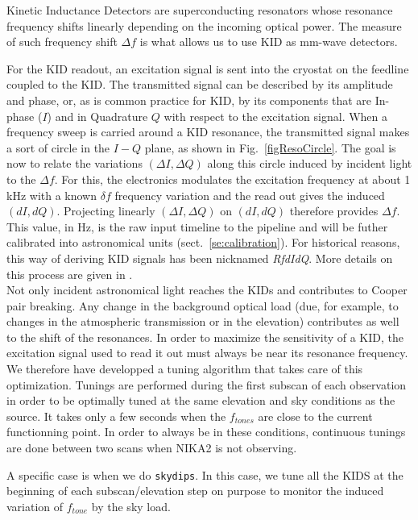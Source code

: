 Kinetic Inductance Detectors are superconducting resonators whose resonance
frequency shifts linearly depending on the incoming optical power. The measure of such
frequency shift $\Delta f$ is what allows us to use KID as mm-wave detectors.

For the KID readout, an excitation signal is sent into the cryostat on the
feedline coupled to the KID. The transmitted signal can be described by its
amplitude and phase, or, as is common practice for KID, by its components that
are In-phase ($I$) and in Quadrature $Q$ with respect to the excitation
signal. When a frequency sweep is carried around a KID resonance, the
transmitted signal makes a sort of circle in the $I-Q$ plane, as shown
in Fig.~\ref{figResoCircle}.
The goal is now to relate the variations $(\Delta I, \Delta
Q)$ along this circle induced by incident light to the $\Delta f$. For this, the
electronics modulates the excitation frequency at about 1\,kHz with a known
$\delta f$ frequency variation and the read out gives the induced $(dI,
dQ)$. Projecting linearly $(\Delta I, \Delta Q)$ on $(dI, dQ)$ therefore
provides $\Delta f$. This value, in Hz, is the raw input timeline to the
pipeline and will be futher calibrated into astronomical units
(sect.~\ref{se:calibration}). For historical reasons, this way of deriving KID
signals has been nicknamed \emph{RfdIdQ}. More details on this process are given
in \cite{Calvo13}.\\

Not only incident astronomical light reaches the KIDs and contributes to Cooper
pair breaking. Any change in the background optical load (due, for example, to changes in
the atmospheric transmission or in the elevation) contributes as well to the
shift of the resonances. In order to maximize the sensitivity of a KID, the
excitation signal used to read it out must always be near its resonance
frequency. We therefore have developped a tuning algorithm that takes care of
this optimization. Tunings are performed during the first subscan of each
observation in order to be optimally tuned at the same elevation and sky
conditions as the source. It takes only a few seconds when the $f_{tones}$ are
close to the current functionning point. In order to always be in these
conditions, continuous tunings are done between two scans when NIKA2 is not observing.

A specific case is when we do {\tt skydips}. In this case, we tune all the KIDS
at the beginning of each subscan/elevation step on purpose to monitor the
induced variation of $f_{tone}$ by the sky load.
